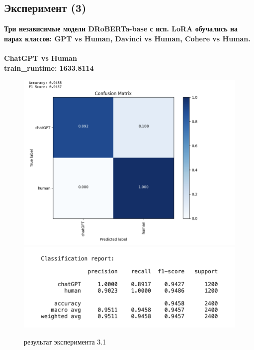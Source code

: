 \subsection{Эксперимент (3)}
\textbf{Три независимые модели DRoBERTa-base с исп. LoRA обучались на парах классов: GPT vs Human, Davinci vs Human, Cohere vs Human.}\\ \\
\textbf{ChatGPT vs Human}\\
\textbf{train\_runtime: 1633.8114}
\begin{figure}[h]
    \centering
    \includegraphics[width=.75\textwidth]{images/chatGPT_human.png}
    \includegraphics[width=.65\textwidth]{images/exp3_gpt.png}
    \caption{результат эксперимента 3.1}
    \label{fig:3}
\end{figure}

